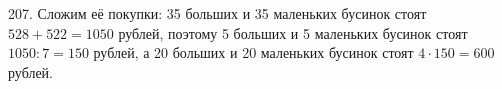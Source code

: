 207. Сложим её покупки: 35 больших и 35 маленьких бусинок стоят $528+522=1050$ рублей, поэтому 5 больших и 5 маленьких бусинок стоят $1050:7=150$ рублей, а 20 больших и 20 маленьких бусинок стоят $4\cdot150=600$ рублей.\\
